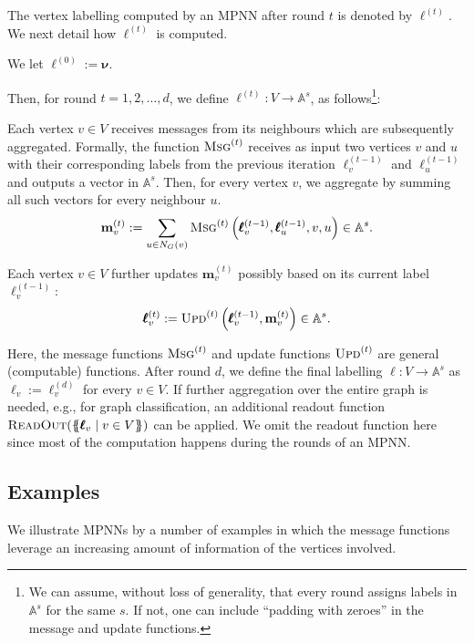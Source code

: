 The vertex labelling computed by an MPNN after round $t$ is denoted by $\pmb{\ell}^{(t)}$. We next detail how $\pmb{\ell}^{(t)}$ is computed.
\begin{description}\setlength{\itemsep}{-0.4ex}
\item [Initialisation.]  We let $\pmb{\ell}^{(0)}:=\pmb{\nu}$.
\end{description}
Then, for round $t=1,2,\ldots,d$, we define $\pmb{\ell}^{(t)}:V\to\mathbb{A}^{s}$, as follows\footnote{We can assume, without loss of generality, that every round assigns labels in $\mathbb{A}^s$ for the same $s$. If not, one can include ``padding with zeroes'' in the message and update functions.}:
\begin{description}\setlength{\itemsep}{-0.4ex}
\item [Message Passing.] Each vertex $v\in V$ receives messages from its neighbours which are subsequently aggregated. Formally, the function $\textsc{Msg}^{(t)}$ receives as input two vertices $v$ and $u$ with their corresponding labels from the previous iteration $\pmb{\ell}^{(t-1)}_v$ and $\pmb{\ell}^{(t-1)}_u$ and outputs a vector in $\mathbb{A}^s$. Then, for every vertex $v$, we aggregate by summing all such vectors for every neighbour $u$.
$$
\mathbf{m}^{(t)}_{v}:=\sum_{u\in N_G(v)}\textsc{Msg}^{(t)}\left(\pmb{\ell}^{(t-1)}_v,\pmb{\ell}^{(t-1)}_u,v,u\right)\in\mathbb{A}^{s}.
$$
\item [Updating.] Each vertex $v\in V$ further updates $\mathbf{m}^{(t)}_{v}$ possibly based on its current label $\pmb{\ell}^{(t-1)}_v$:
$$
\pmb{\ell}^{(t)}_v:=\textsc{Upd}^{(t)}\left(\pmb{\ell}^{(t-1)}_v,\mathbf{m}^{(t)}_{v}\right)\in\mathbb{A}^{s}.
$$
\end{description}
Here, the message functions $\textsc{Msg}^{(t)}$ and update functions
$\textsc{Upd}^{(t)}$ are general (computable) functions. After round $d$, we
define the final labelling $\pmb{\ell}:V\to\mathbb{A}^{s}$ as
$\pmb{\ell}_v:=\pmb{\ell}^{(d)}_v$ for every $v\in V$. If further aggregation
over the entire graph is needed, e.g., for graph classification, an additional
readout function $\textsc{ReadOut}(\{\!\!\{\pmb{\ell}_v\mid v\in V\}\!\!\})$ can be
applied. We omit the readout function here since most of the computation
happens during the rounds of an MPNN.

\subsection{Examples}
We illustrate MPNNs by a number of examples in which the message functions leverage an increasing amount of information of the vertices involved. 

